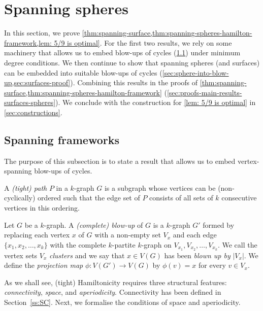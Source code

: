 \documentclass[12pt,reqno]{amsart}
\theoremstyle{plain}
\theoremstyle{definition}
\numberwithin{equation}{section}
\begin{document}
	
	
	



    
	\section{Spanning spheres}\label{s:HamSpheres}
	
	In this section, we prove \cref{thm:spanning-surface,thm:spanning-spheres-hamilton-framework,lem: 5/9 is optimal}. 
	For the first two results, we rely on some machinery that allows us to embed blow-ups of cycles (\cref{sec:hamilton-frameworks}) under minimum degree conditions.
	We then continue to show that spanning spheres (and surfaces) can be embedded into suitable blow-ups of cycles (\cref{sec:sphere-into-blow-up,sec:surfaces-proof}).
	Combining this results in the proofs of \cref{thm:spanning-surface,thm:spanning-spheres-hamilton-framework} (\cref{sec:proofs-main-results-surfaces-spheres}).
	We conclude with the construction for \cref{lem: 5/9 is optimal} in \cref{sec:constructions}.
	
	
	
	
	\subsection{Spanning frameworks}\label{sec:hamilton-frameworks}
    
	The purpose of this subsection is to state a result that allows us to embed vertex-spanning blow-ups of cycles.
	
	A \emph{(tight) path} $P$ in a $k$-graph $G$ is a subgraph whose vertices can be (non-cyclically) ordered such that the edge set of $P$ consists of all sets of $k$ consecutive vertices in this ordering.
	
	Let $G$ be a $k$-graph. A \emph{(complete) blow-up} of $G$ is a $k$-graph $G'$ formed by replacing each vertex $x$ of $G$ with a non-empty set $V_x$ and each edge $\{x_1, x_2, \ldots, x_k\}$ with the complete $k$-partite $k$-graph on $V_{x_1}, V_{x_2}, \ldots, V_{x_k}$. We call the vertex sets $V_x$ \emph{clusters} and we say that $x \in V(G)$ has been \emph{blown up by} $|V_x|$. We define the \emph{projection map} $\phi \colon V(G') \to V(G)$ by $\phi(v) = x$ for every $v \in V_x$.
	
	As we shall see, (tight) Hamiltonicity requires three structural features: \emph{connectivity}, \emph{space}, and \emph{aperiodicity}.
	Connectivity has been defined in Section~\ref{ss:SC}. Next, we formalise the conditions of space and aperiodicity.
	
\end{document}

